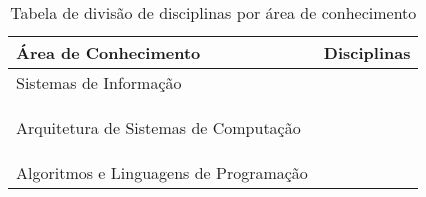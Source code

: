 \begin{table}[ht]
	\centering
	\caption{Tabela de divisão de disciplinas por área de conhecimento}
	\label{tab:areas}
	\begin{tabularx}{\textwidth}{| X | l |}
		\hiderowcolors
		\hline
		{\bf Área de Conhecimento}                              & {\bf Disciplinas} \\
		\hline
		\multirow{4}{*}{Sistemas de Informação}                 & \EngSistA         \\
		                                                        & \EletGeo          \\
		                                                        & \ProjBD           \\
		                                                        & \EngCompSoc       \\
		                                                        & \MineraDados      \\ \hline
		\multirow{8}{*}{Arquitetura de Sistemas de Computação}  & \ArqComp          \\
		                                                        & \EletArq          \\
		                                                        & \FundComp         \\
		                                                        & \ProjSO           \\
		                                                        & \EletRedes        \\
		                                                        & \SistEmb          \\
		                                                        & \Telep            \\
		                                                        & \CompParal        \\
		                                                        & \Control          \\ \hline
		\multirow{9}{*}{Algoritmos e Linguagens de Programação} & \AlgComp          \\
		                                                        & \EngComput        \\
		                                                        & \EstrInf          \\
		                                                        & \LabProgA         \\
		                                                        & \LabProgB         \\

\end{tabularx}
\end{table}
